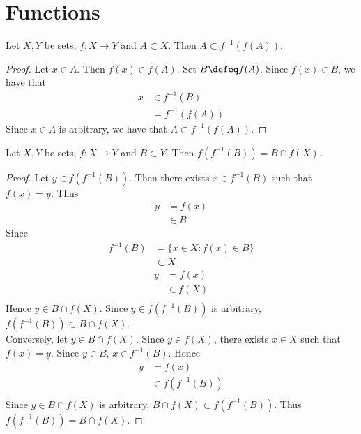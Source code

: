 \documentclass{book}
\begin{document}
	\section{Functions}
	
	\begin{ex} 
		Let $X, Y$ be sets, $f:X \rightarrow Y$ and $A \subset X$. Then $A \subset f^{-1}(f(A))$.
	\end{ex}

	\begin{proof}
		Let $x \in A$. Then $f(x) \in f(A)$. Set $B \defeq f(A)$. Since $f(x) \in B$, we have that 
		\begin{align*}
			x 
			& \in f^{-1}(B) \\
			& = f^{-1}(f(A))
		\end{align*}
		Since $x \in A$ is arbitrary, we have that $A \subset f^{-1}(f(A))$. 
	\end{proof}
	
	\begin{ex} 
		Let $X, Y$ be sets, $f:X \rightarrow Y$ and $B \subset Y$. Then $f(f^{-1}(B)) = B \cap f(X)$. 
	\end{ex}

	\begin{proof}
		Let $y \in f(f^{-1}(B))$. Then there exists $x \in f^{-1}(B)$ such that $f(x) = y$. Thus 
		\begin{align*}
			y
			& = f(x) \\
			& \in B
		\end{align*}
		Since 
		\begin{align*}
			f^{-1}(B) 
			& = \{x \in X: f(x) \in B\} \\
			& \subset X
		\end{align*}
		\begin{align*}
			y
			& = f(x) \\
			& \in f(X) \\
		\end{align*}
			Hence $y \in B \cap f(X)$. Since $y \in f(f^{-1}(B))$ is arbitrary, $f(f^{-1}(B)) \subset  B \cap f(X)$.\\
			Conversely, let $y \in B \cap f(X)$. Since $y \in f(X)$, there exists $x \in X$ such that $f(x) = y$. Since $y \in B$, $x \in f^{-1}(B)$. Hence 
			\begin{align*}
				y
				& = f(x) \\
				& \in f(f^{-1}(B)) \\
			\end{align*}
			Since $y \in B \cap f(X)$ is arbitrary, $B \cap f(X) \subset f(f^{-1}(B))$. Thus $f(f^{-1}(B)) =  B \cap f(X)$.
		\end{proof}
	
\end{document}
